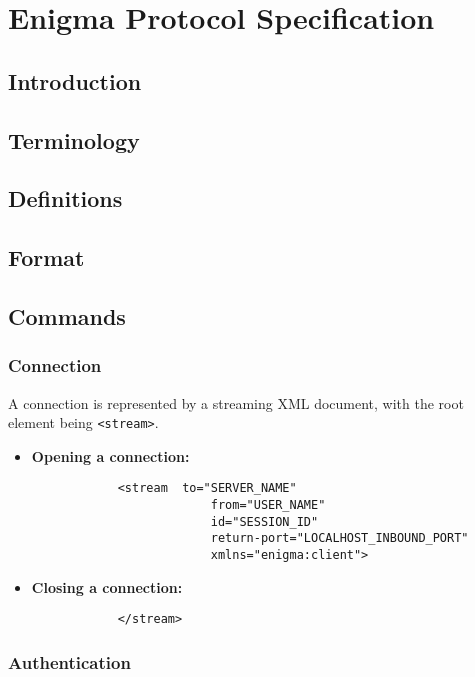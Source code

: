 
\chapter{Enigma Protocol Specification}
\label{AppendixB}

\section{Introduction}

\section{Terminology}

\section{Definitions}

\section{Format}

\section{Commands}

\subsection{Connection}

A connection is represented by a streaming XML document, with the root element being \verb!<stream>!.

\begin{itemize}
	\item \textbf{Opening a connection:}
		\begin{verbatim}
			<stream  to="SERVER_NAME"
				         from="USER_NAME"
				         id="SESSION_ID"
				         return-port="LOCALHOST_INBOUND_PORT"
				         xmlns="enigma:client">
		\end{verbatim}
	\item \textbf{Closing a connection:}
		\begin{verbatim}
			</stream>
		\end{verbatim}
\end{itemize}

\subsection{Authentication}

